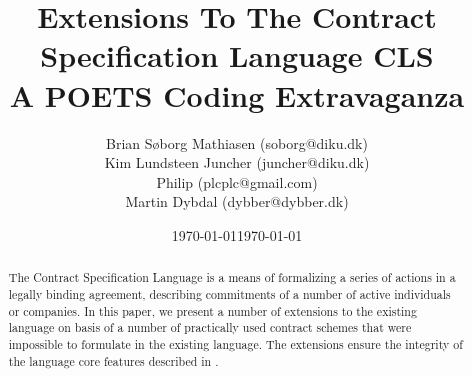 \documentclass[a4paper,oneside, final, twocolumn]{memoir}
\title{Extensions To The Contract Specification Language CLS\\
        \small{A POETS Coding Extravaganza}}
\author{Brian Søborg Mathiasen (soborg@diku.dk) \\ Kim Lundsteen Juncher (juncher@diku.dk) \\ Philip (plcplc@gmail.com) \\ Martin Dybdal (dybber@dybber.dk)}
\date{\today} %
\date{\today}
\begin{document}
\begin{abstract}
The Contract Specification Language\cite{hvitved10} is a means of formalizing a
series of actions in a legally binding agreement, describing commitments of a
number of active individuals or companies. In this paper, we present a number of
extensions to the existing language on basis of a number of practically used
contract schemes that were impossible to formulate in the existing language. The
extensions ensure the integrity of the language core features described in
\cite{hvitved10}.
\end{abstract}

\maketitle
\newpage

\renewcommand\bibname{References}


\end{document}
